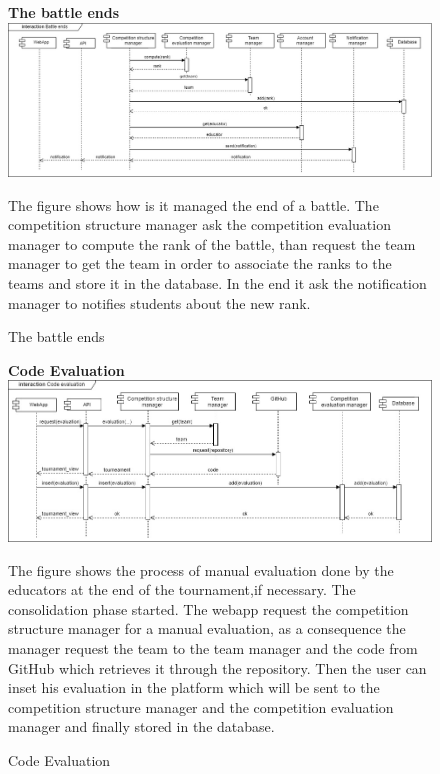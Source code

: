 \begin{enumerate}[label=\textbf{[UC\arabic*]}]
    \begin{figure}
    \item \textbf{The battle ends}
        \centering
        \includegraphics[width= \textwidth]{Images/Battle_ends.jpg}
        \caption{The battle ends}
        \label{fig:enter-label}
        \raggedright The figure shows how is it managed the end of a battle. The competition structure manager ask the competition evaluation manager to compute the rank of the battle, than request the team manager to get the team in order to associate the ranks to the teams and store it in the database. In the end it ask the notification manager to notifies students about the new rank.
    \end{figure}
    
    \begin{figure}
    \item \textbf{Code Evaluation}
        \centering
        \includegraphics[width= \textwidth]{Images/Code_Evaluation.jpg}
        \caption{Code Evaluation}
        \label{fig:enter-label}
        \raggedright The figure shows the process of manual evaluation done by the educators at the end of the tournament,if necessary. The consolidation phase started. The webapp request the competition structure manager for a manual evaluation, as a consequence the manager request the team to the team manager and the code from GitHub which retrieves it through the repository. Then the user can inset his evaluation in the platform which will be sent to the competition structure manager and the competition evaluation manager and finally stored in the database.
    \end{figure}


\end{enumerate}
